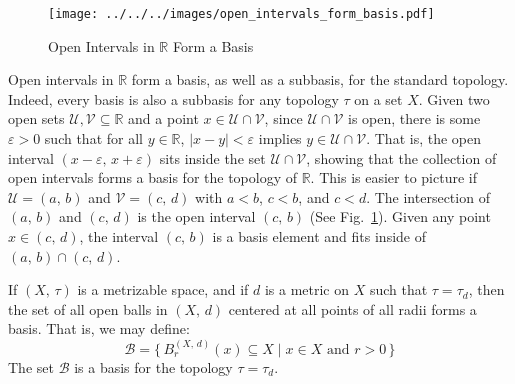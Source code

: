 \documentclass{article}
\theoremstyle{plain}
\theoremstyle{normal}
\newenvironment{example}{%
    \pushQED{\qed}\renewcommand{\qedsymbol}{$\blacksquare$}\examplex%
}{%
    \popQED\endexamplex%
}
\begin{document}
        \begin{figure}
            \centering
            \texttt{[image: ../../../images/open\_intervals\_form\_basis.pdf]}
            \caption{Open Intervals in $\mathbb{R}$ Form a Basis}
            \label{fig:open_intervals_form_basis}
        \end{figure}
        \begin{example}
            Open intervals in $\mathbb{R}$ form a basis, as well as a subbasis,
            for the standard topology. Indeed, every basis is also a subbasis
            for any topology $\tau$ on a set $X$.
            Given two open sets $\mathcal{U},\mathcal{V}\subseteq\mathbb{R}$
            and a point $x\in\mathcal{U}\cap\mathcal{V}$, since
            $\mathcal{U}\cap\mathcal{V}$ is open, there is some
            $\varepsilon>0$ such that for all $y\in\mathbb{R}$,
            $|x-y|<\varepsilon$ implies $y\in\mathcal{U}\cap\mathcal{V}$. That
            is, the open interval $(x-\varepsilon,\,x+\varepsilon)$ sits inside
            the set $\mathcal{U}\cap\mathcal{V}$, showing that the collection
            of open intervals forms a basis for the topology of $\mathbb{R}$.
            This is easier to picture if $\mathcal{U}=(a,\,b)$ and
            $\mathcal{V}=(c,\,d)$ with $a<b$, $c<b$, and $c<d$. The
            intersection of $(a,\,b)$ and $(c,\,d)$ is the open interval
            $(c,\,b)$ (See Fig.~\ref{fig:open_intervals_form_basis}). Given
            any point $x\in(c,\,d)$, the interval $(c,\,b)$ is a basis element
            and fits inside of $(a,\,b)\cap(c,\,d)$.
        \end{example}
        \begin{example}
            If $(X,\,\tau)$ is a metrizable space, and if $d$ is a metric on
            $X$ such that $\tau=\tau_{d}$, then the set of all open balls
            in $(X,\,d)$ centered at all points of all radii forms a basis.
            That is, we may define:
            \begin{equation}
                \mathcal{B}=\{\,B_{r}^{(X,\,d)}(x)\subseteq{X}\;|\;
                    x\in{X}\textrm{ and }r>0\,\}
            \end{equation}
            The set $\mathcal{B}$ is a basis for the topology
            $\tau=\tau_{d}$.
        \end{example}
\end{document}
